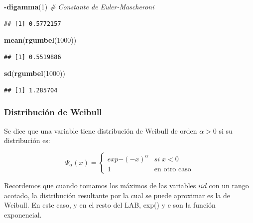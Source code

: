 \documentclass[
  oneside]{book}
\newenvironment{Shaded}{\begin{snugshade}}{\end{snugshade}}
\newcommand{\CommentTok}[1]{\textcolor[rgb]{0.56,0.35,0.01}{\textit{#1}}}
\newcommand{\DecValTok}[1]{\textcolor[rgb]{0.00,0.00,0.81}{#1}}
\newcommand{\FunctionTok}[1]{\textcolor[rgb]{0.13,0.29,0.53}{\textbf{#1}}}
\newcommand{\NormalTok}[1]{#1}
\newcommand{\SpecialCharTok}[1]{\textcolor[rgb]{0.81,0.36,0.00}{\textbf{#1}}}
\begin{document}
\begin{Shaded}
\begin{Highlighting}[]
\SpecialCharTok{{-}}\FunctionTok{digamma}\NormalTok{(}\DecValTok{1}\NormalTok{) }\CommentTok{\# Constante de Euler{-}Mascheroni}
\end{Highlighting}
\end{Shaded}

\begin{verbatim}
## [1] 0.5772157
\end{verbatim}

\begin{Shaded}
\begin{Highlighting}[]
\FunctionTok{mean}\NormalTok{(}\FunctionTok{rgumbel}\NormalTok{(}\DecValTok{1000}\NormalTok{))}
\end{Highlighting}
\end{Shaded}

\begin{verbatim}
## [1] 0.5519886
\end{verbatim}

\begin{Shaded}
\begin{Highlighting}[]
\FunctionTok{sd}\NormalTok{(}\FunctionTok{rgumbel}\NormalTok{(}\DecValTok{1000}\NormalTok{))}
\end{Highlighting}
\end{Shaded}

\begin{verbatim}
## [1] 1.285704
\end{verbatim}

\hypertarget{distribuciuxf3n-de-weibull}{%
\subsubsection{Distribución de
Weibull}\label{distribuciuxf3n-de-weibull}}

Se dice que una variable tiene distribución de Weibull de orden
\(\alpha>0\) si su distribución es:

\begin{equation}
\Psi_{\alpha}(x)=\begin{cases}
exp{-(-x)^{\alpha}} & si\;x<0\\
1 & \text{en otro caso}
\end{cases}
\end{equation}

Recordemos que cuando tomamos los máximos de las variables \(iid\) con
un rango acotado, la distribución resultante por la cual se puede
aproximar es la de Weibull. En este caso, y en el resto del LAB, exp() y
e son la función exponencial.
\end{document}
